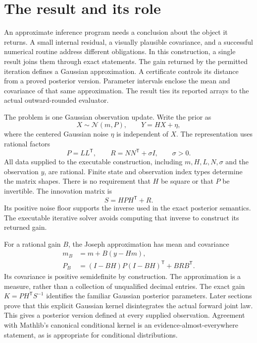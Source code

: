 \clearpage\tableofcontents\clearpage
\section{The result and its role}
An approximate inference program needs a conclusion about the object it returns. A small internal residual, a visually plausible covariance, and a successful numerical routine address different obligations. In this construction, a single result joins them through exact statements. The gain returned by the permitted iteration defines a Gaussian approximation. A certificate controls its distance from a proved posterior version. Parameter intervals enclose the mean and covariance of that same approximation. The result ties its reported arrays to the actual outward-rounded evaluator.

The problem is one Gaussian observation update. Write the prior as
\[
X\sim\mathcal N(m,P),\qquad Y=HX+\eta,
\]
where the centered Gaussian noise $\eta$ is independent of $X$. The representation uses rational factors
\[
P=LL^{\mathsf T},\qquad R=NN^{\mathsf T}+\sigma I,
\qquad \sigma>0.
\]
All data supplied to the executable construction, including $m,H,L,N,\sigma$ and the observation $y$, are rational. Finite state and observation index types determine the matrix shapes. There is no requirement that $H$ be square or that $P$ be invertible. The innovation matrix is
\[
S=HPH^{\mathsf T}+R.
\]
Its positive noise floor supports the inverse used in the exact posterior semantics. The executable iterative solver avoids computing that inverse to construct its returned gain.

For a rational gain $B$, the Joseph approximation has mean and covariance
\begin{align*}
m_B&=m+B(y-Hm),\\
P_B&=(I-BH)P(I-BH)^{\mathsf T}+BRB^{\mathsf T}.
\end{align*}
Its covariance is positive semidefinite by construction. The approximation is a measure, rather than a collection of unqualified decimal entries. The exact gain $K=PH^{\mathsf T}S^{-1}$ identifies the familiar Gaussian posterior parameters. Later sections prove that this explicit Gaussian kernel disintegrates the actual forward joint law. This gives a posterior version defined at every supplied observation. Agreement with Mathlib's canonical conditional kernel is an evidence-almost-everywhere statement, as is appropriate for conditional distributions.

